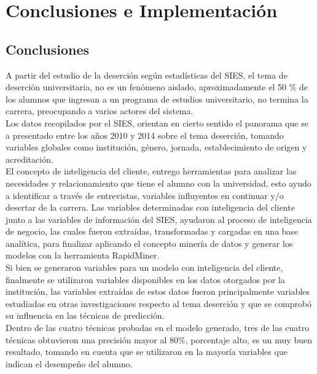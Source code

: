 \chapter[Conclusiones e Implementación]{Conclusiones e Implementación}
\label{ch:conclu}

\section{Conclusiones}
A partir del estudio de la deserción según estadísticas del SIES, el tema de deserción universitaria, no es un fenómeno aislado, aproximadamente el 50 \%  de los alumnos que ingresan a un programa de estudios universitario, no termina la carrera, preocupando a varios actores del sistema.\\

Los datos recopilados por el SIES, orientan en cierto sentido el panorama que se a presentado entre los años 2010 y 2014 sobre el tema deserción, tomando variables globales como institución, género, jornada, establecimiento de origen y acreditación.\\

El concepto de inteligencia del cliente, entrego herramientas para analizar las necesidades y relacionamiento que tiene el alumno con la universidad, esto ayudo a identificar a través de entrevistas, variables influyentes en continuar y/o desertar de la carrera. Las variables determinadas con inteligencia del cliente junto a las variables de información del SIES, ayudaron al proceso de inteligencia de negocio, las cuales fueron extraídas, transformadas y cargadas en una base analítica, para finalizar aplicando el concepto minería de datos y generar los modelos con la herramienta RapidMiner.\\

Si bien se generaron variables para un modelo con inteligencia del cliente, finalmente se utilizaron variables disponibles en los datos otorgados por la institución, las variables extraídas de estos datos fueron principalmente variables estudiadas en otras investigaciones respecto al tema deserción y que se comprobó su influencia en las técnicas de predicción.\\

Dentro de las cuatro técnicas probadas en el modelo generado, tres de las cuatro técnicas obtuvieron una precisión mayor al 80\%, porcentaje alto, es un muy buen resultado, tomando en cuenta que se utilizaron en la mayoría variables que indican el desempeño del alumno.\\

